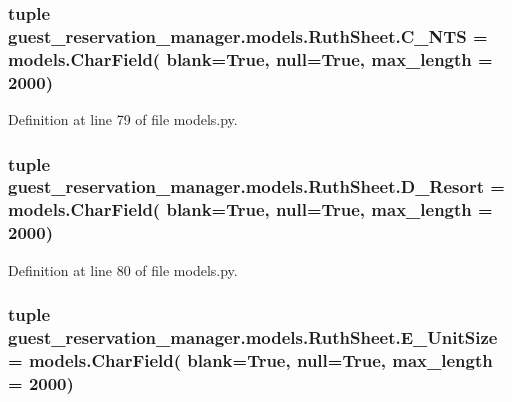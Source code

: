 \hypertarget{classguest__reservation__manager_1_1models_1_1RuthSheet_a7ba8fa55b42241acbc4a43e31114d4ff}{
\subsubsection[{C\-\_\-\-N\-T\-S}]{\setlength{\rightskip}{0pt plus 5cm}tuple guest\-\_\-reservation\-\_\-manager.\-models.\-Ruth\-Sheet.\-C\-\_\-\-N\-T\-S = models.\-Char\-Field( blank=True, null=True, max\-\_\-length = 2000)\hspace{0.3cm}{\ttfamily [static]}}}\label{classguest__reservation__manager_1_1models_1_1RuthSheet_a7ba8fa55b42241acbc4a43e31114d4ff}


Definition at line 79 of file models.\-py.

\hypertarget{classguest__reservation__manager_1_1models_1_1RuthSheet_aef196aa193d1942c16b4793086489ed4}{
\subsubsection[{D\-\_\-\-Resort}]{\setlength{\rightskip}{0pt plus 5cm}tuple guest\-\_\-reservation\-\_\-manager.\-models.\-Ruth\-Sheet.\-D\-\_\-\-Resort = models.\-Char\-Field( blank=True, null=True, max\-\_\-length = 2000)\hspace{0.3cm}{\ttfamily [static]}}}\label{classguest__reservation__manager_1_1models_1_1RuthSheet_aef196aa193d1942c16b4793086489ed4}


Definition at line 80 of file models.\-py.

\hypertarget{classguest__reservation__manager_1_1models_1_1RuthSheet_a9a56b24a74583dd22ca14d2926f62fba}{
\subsubsection[{E\-\_\-\-Unit\-Size}]{\setlength{\rightskip}{0pt plus 5cm}tuple guest\-\_\-reservation\-\_\-manager.\-models.\-Ruth\-Sheet.\-E\-\_\-\-Unit\-Size = models.\-Char\-Field( blank=True, null=True, max\-\_\-length = 2000)\hspace{0.3cm}{\ttfamily [static]}}}\label{classguest__reservation__manager_1_1models_1_1RuthSheet_a9a56b24a74583dd22ca14d2926f62fba}


